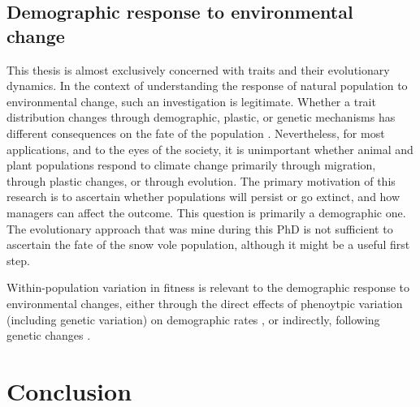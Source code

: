 \subsection{Demographic response to environmental change}
This thesis is almost exclusively concerned with traits and their evolutionary dynamics. 
In the context of understanding the response of natural population to environmental change, such an investigation is legitimate. Whether a trait distribution changes through demographic, plastic, or genetic mechanisms has different consequences on the fate of the population \parencite{Chevin2010}.
Nevertheless, for most applications, and to the eyes of the society, it is unimportant whether animal and plant populations respond to climate change primarily through migration, through plastic changes, or through evolution. The primary motivation of this research is to ascertain whether populations will persist or go extinct, and how managers can affect the outcome.
This question is primarily a demographic one. The evolutionary approach that was mine during this PhD is not sufficient to ascertain the fate of the snow vole population, although it might be a useful first step.


Within-population variation in fitness is relevant to the demographic response to environmental changes, either through the direct effects of phenoytpic variation (including genetic variation) on demographic rates \parencite{Kendall2011, vindenes2015, Plard2016}, or indirectly, following genetic changes \parencite{Chevin2010a, Turcotte2011, Schiffers2013a}. 

\section{Conclusion}


\printbibliography[heading=subbibliography]

